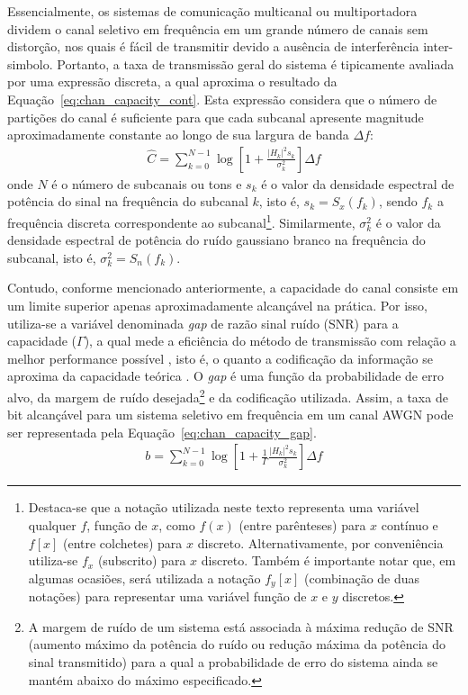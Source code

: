 Essencialmente, os sistemas de comunicação multicanal ou multiportadora dividem o canal seletivo em frequência em um grande número de canais sem distorção, nos quais é fácil de transmitir devido a ausência de interferência inter-simbolo. Portanto, a taxa de transmissão geral do sistema é tipicamente avaliada por uma expressão discreta, a qual aproxima o resultado da Equação~\ref{eq:chan_capacity_cont}. Esta expressão considera que o número de partições do canal é suficiente para que cada subcanal apresente magnitude aproximadamente constante ao longo de sua largura de banda $\Delta f$:
\begin{align}
\hat{C } = \sum \limits_{k=0}^{N-1} \log \left[1 + \frac{ \left|H_k\right|^2 s_k }{ \sigma_k^2} \right] \Delta f
\label{eq:chan_capacity_disc}
\end{align}
onde $N$ é o número de subcanais ou tons e $s_k$ é o valor da densidade espectral de potência do sinal na frequência do subcanal $k$, isto é, $s_k = S_x(f_k)$, sendo $f_k$ a frequência discreta correspondente ao subcanal\footnote{Destaca-se que a notação utilizada neste texto representa uma variável qualquer $f$, função de $x$, como $f(x)$ (entre parênteses) para $x$ contínuo e $f[x]$ (entre colchetes) para $x$ discreto. Alternativamente,  por conveniência utiliza-se $f_x$ (subscrito) para $x$ discreto. Também é importante notar que, em algumas ocasiões, será utilizada a notação $f_y[x]$ (combinação de duas notações) para representar uma variável função de $x$ e $y$ discretos.}. Similarmente, $\sigma_k^2$ é o valor da densidade espectral de potência do ruído gaussiano branco na frequência do subcanal, isto é,  $\sigma_k^2 = S_n(f_k)$.

Contudo, conforme mencionado anteriormente, a capacidade do canal consiste em um limite superior apenas aproximadamente alcançável na prática. Por isso, utiliza-se a variável denominada \textsl{gap} de razão sinal ruído (SNR) para a capacidade ($\Gamma$), a qual mede a eficiência do método de transmissão com relação a melhor performance possível \cite{cioffibook1999}, isto é,  o quanto a codificação da informação se aproxima da capacidade teórica \cite{cendrillonthesis}. O \textsl{gap} é uma função da probabilidade de erro alvo, da margem de ruído desejada\footnote{ A margem de ruído de um sistema está associada à máxima redução de SNR (aumento máximo da potência do ruído ou redução máxima da potência do sinal transmitido) para a qual a probabilidade de erro do sistema ainda se mantém abaixo do máximo especificado.} e da codificação utilizada. Assim, a taxa de bit alcançável para um sistema seletivo em frequência em um canal AWGN pode ser representada pela Equação~\ref{eq:chan_capacity_gap}.
\begin{align}
b = \sum \limits_{k=0}^{N-1} \log \left[1 + \frac{1}{\Gamma}\frac{ \left|H_k \right|^2 s_k }{ \sigma_k^2 } \right] \Delta f
\label{eq:chan_capacity_gap}
\end{align}

